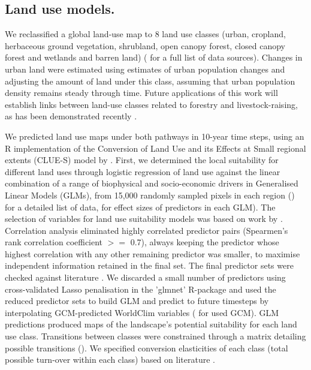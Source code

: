 \subsection{Land use models.} We reclassified a global land-use map to 8 land use classes (urban, cropland, herbaceous ground vegetation, shrubland, open canopy forest, closed canopy forest and wetlands and barren land) ( for a full list of data sources). Changes in urban land were estimated using estimates of urban population changes \citep{world_bank_group_population_2016} and adjusting the amount of land under this class, assuming that urban population density remains steady through time. Future applications of this work will establish links between land-use classes related to forestry and livestock-raising, as has been demonstrated recently \citep{marques_increasing_2019}.

We predicted land use maps under both pathways in 10-year time steps, using an R implementation \citep[R package 'lulcc']{moulds_open_2015} of the Conversion of Land Use and its Effects at Small regional extents (CLUE-S) model by \citet{verburg_modeling_2002}. First, we determined the local suitability for different land uses through logistic regression of land use against the linear combination of a range of biophysical and socio-economic drivers in Generalised Linear Models (GLMs), from 15,000 randomly sampled pixels in each region () for a detailed list of data,  for effect sizes of predictors in each GLM). The selection of variables for land use suitability models was based on work by \citet{verburg_land_1999}. Correlation analysis eliminated highly correlated predictor pairs (Spearmen's rank correlation coefficient $>=$ 0.7), always keeping the predictor whose highest correlation with any other remaining predictor was smaller, to maximise independent information retained in the final set. The final predictor sets were checked against literature \citep{verburg_downscaling_2006, verburg_spatial_1999}. We discarded a small number of predictors using cross-validated Lasso penalisation in the 'glmnet' R-package \citep{friedman_regularization_2010} and used the reduced predictor sets to build GLM and predict to future timesteps by interpolating GCM-predicted WorldClim variables ( for used GCM). GLM predictions produced maps of the landscape's potential suitability for each land use class. Transitions between classes were constrained through a matrix detailing possible transitions (). We specified conversion elasticities of each class (total possible turn-over within each class) based on literature \citep{moulds_open_2015,verburg_modeling_2002}.

